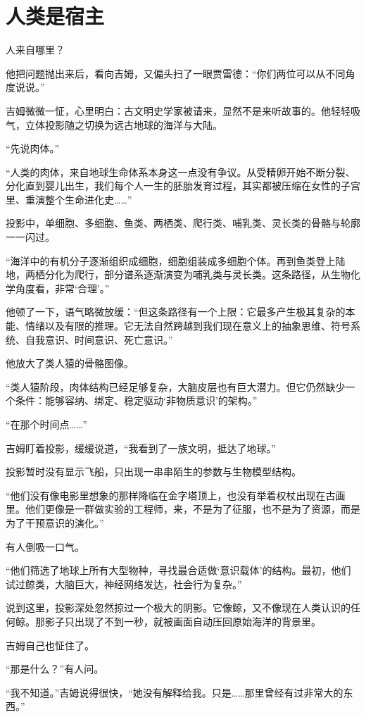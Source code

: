 \chapter{人类是宿主}

人来自哪里？

他把问题抛出来后，看向吉姆，又偏头扫了一眼贾雷德：“你们两位可以从不同角度说说。”

吉姆微微一怔，心里明白：古文明史学家被请来，显然不是来听故事的。他轻轻吸气，立体投影随之切换为远古地球的海洋与大陆。

“先说肉体。”

“人类的肉体，来自地球生命体系本身这一点没有争议。从受精卵开始不断分裂、分化直到婴儿出生，我们每个人一生的胚胎发育过程，其实都被压缩在女性的子宫里、重演整个生命进化史……”

投影中，单细胞、多细胞、鱼类、两栖类、爬行类、哺乳类、灵长类的骨骼与轮廓一一闪过。

“海洋中的有机分子逐渐组织成细胞，细胞组装成多细胞个体。再到鱼类登上陆地，两栖分化为爬行，部分谱系逐渐演变为哺乳类与灵长类。这条路径，从生物化学角度看，非常‘合理’。”

他顿了一下，语气略微放缓：“但这条路径有一个上限：它最多产生极其复杂的本能、情绪以及有限的推理。它无法自然跨越到我们现在意义上的抽象思维、符号系统、自我意识、时间意识、死亡意识。”

他放大了类人猿的骨骼图像。

“类人猿阶段，肉体结构已经足够复杂，大脑皮层也有巨大潜力。但它仍然缺少一个条件：能够容纳、绑定、稳定驱动‘非物质意识’的架构。”

“在那个时间点……”

吉姆盯着投影，缓缓说道，“我看到了一族文明，抵达了地球。”

投影暂时没有显示飞船，只出现一串串陌生的参数与生物模型结构。

“他们没有像电影里想象的那样降临在金字塔顶上，也没有举着权杖出现在古画里。他们更像是一群做实验的工程师，来，不是为了征服，也不是为了资源，而是为了干预意识的演化。”

有人倒吸一口气。

“他们筛选了地球上所有大型物种，寻找最合适做‘意识载体’的结构。最初，他们试过鲸类，大脑巨大，神经网络发达，社会行为复杂。”

说到这里，投影深处忽然掠过一个极大的阴影。它像鲸，又不像现在人类认识的任何鲸。那影子只出现了不到一秒，就被画面自动压回原始海洋的背景里。

吉姆自己也怔住了。

“那是什么？”有人问。

“我不知道。”吉姆说得很快，“她没有解释给我。只是……那里曾经有过非常大的东西。”

